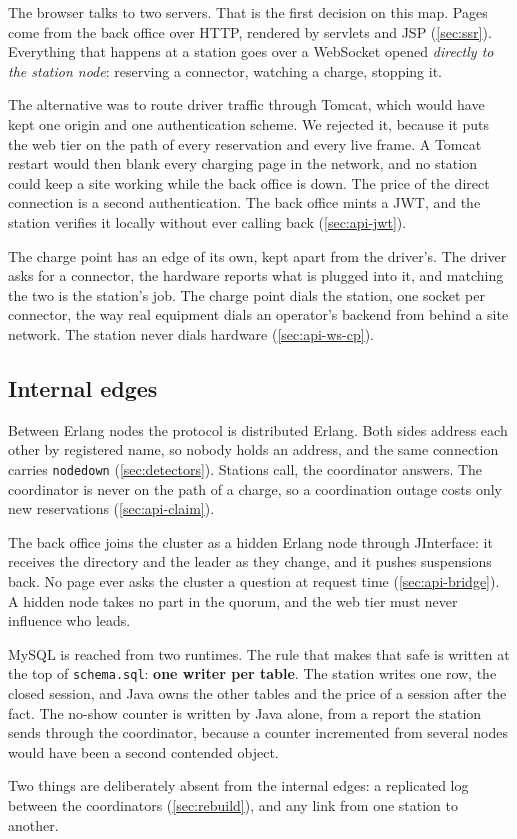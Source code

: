 The browser talks to two servers. That is the first decision on this map. Pages come from
the back office over HTTP, rendered by servlets and JSP (\cref{sec:ssr}). Everything that
happens at a station goes over a WebSocket opened \emph{directly to the station node}:
reserving a connector, watching a charge, stopping it.

The alternative was to route driver traffic through Tomcat, which would have kept one origin
and one authentication scheme. We rejected it, because it puts the web tier on the path of
every reservation and every live frame. A Tomcat restart would then blank every charging
page in the network, and no station could keep a site working while the back office is down.
The price of the direct connection is a second authentication. The back office mints a JWT,
and the station verifies it locally without ever calling back (\cref{sec:api-jwt}).

The charge point has an edge of its own, kept apart from the driver's. The driver asks for a
connector, the hardware reports what is plugged into it, and matching the two is the
station's job. The charge point
dials the station, one socket per connector, the way real equipment dials an operator's
backend from behind a site network. The station never dials hardware
(\cref{sec:api-ws-cp}).

\subsection{Internal edges}
\label{sec:protocols-internal}

Between Erlang nodes the protocol is distributed Erlang. Both sides address each other by
registered name, so nobody holds an address, and the same connection carries
\texttt{nodedown} (\cref{sec:detectors}). Stations call, the coordinator answers. The
coordinator is never on the path of a charge, so a coordination outage costs only new
reservations (\cref{sec:api-claim}).

The back office joins the cluster as a hidden Erlang node through JInterface: it receives
the directory and the leader as they change, and it pushes suspensions back. No page ever
asks the cluster a question at request time (\cref{sec:api-bridge}). A hidden node takes no
part in the quorum, and the web tier must never influence who leads.

MySQL is reached from two runtimes. The rule that makes that safe is written at the top of
\texttt{schema.sql}: \textbf{one writer per table}. The station writes one row, the closed
session, and Java owns the other tables and the price of a session after the fact. The
no-show counter is written by Java alone, from a report the station sends through the
coordinator, because a counter incremented from several nodes would have been a second
contended object.

Two things are deliberately absent from the internal edges: a replicated log between the
coordinators (\cref{sec:rebuild}), and any link from one station to another.
